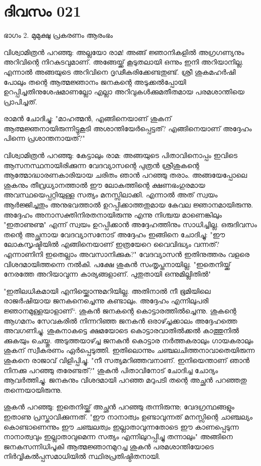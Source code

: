\newpage
\section{ദിവസം 021}

ഭാഗം 2. മുമുക്ഷു പ്രകരണം ആരംഭം 


വിശ്വാമിത്രന്‍ പറഞ്ഞു: അല്ലയോ രാമ! അങ്ങ്‌ ജ്ഞാനികളില്‍ അഗ്രഗണ്യനും അറിവിന്റെ നിറകുടവുമാണ്‌. അങ്ങേയ്ക്ക്‌ കൂടുതലായി ഒന്നും  ഇനി അറിയാനില്ല. എന്നാല്‍ അങ്ങയുടെ അറിവിനെ ദൃഢീകരിക്കേണ്ടതുണ്ട്‌. ശ്രീ ശുകമഹര്‍ഷി പോലും തന്റെ ആത്മജ്ഞാനം ജനകന്റെ അടുക്കല്‍പ്പോയി ഉറപ്പിച്ചതിനുശേഷമാണല്ലോ എല്ലാ അറിവുകള്‍ക്കുമതീതമായ പരമശാന്തിയെ പ്രാപിച്ചത്‌. 

രാമന്‍ ചോദിച്ചു: "മാഹത്മന്‍, എങ്ങിനെയാണ്‌ ശുകന്‌ ആത്മജ്ഞനായിരുന്നിട്ടുകൂടി അശാന്തിയേര്‍പ്പെട്ടത്‌? എങ്ങിനെയാണ്‌ അദ്ദേഹം പിന്നെ പ്രശാന്തനായത്‌?"

വിശ്വാമിത്രന്‍ പറഞ്ഞു: കേട്ടാലും രാമ: അങ്ങയുടെ പിതാവിനൊപ്പം ഇവിടെ ആസനസ്ഥനായിരിക്കുന്ന വേദവ്യാസന്റെ പുത്രന്‍ ശ്രീശുകന്റെ ആത്മോദ്ധാരണകാരിയായ ചരിതം ഞാന്‍ പറഞ്ഞു തരാം. അങ്ങയേപ്പോലെ ശുകനും തീവ്രധ്യാനത്താല്‍ ഈ ലോകത്തിന്റെ ക്ഷണഭംഗുരമായ അവസ്ഥയെപ്പറ്റിയുള്ള സത്യം  മനസ്സിലാക്കി. എന്നാല്‍ അത്‌ സ്വയം ആര്‍ജ്ജിച്ചതും അനുഭവത്താല്‍ ഉറപ്പിക്കാത്തതുമായ കേവല ജ്ഞാനമായിരുന്നു. അദ്ദേഹം അനാസക്തിനിരതനായിരുന്നു എന്നു നിശ്ചയ  മാണെങ്കിലും "ഇതാണുണ്മ" എന്ന് സ്വയം ഉറപ്പിക്കാന്‍ അദ്ദേഹത്തിനും സാധിച്ചില്ല. ഒരുദിവസം തന്റെ അച്ഛനായ വേദവ്യാസനോട്‌ അദ്ദേഹം ഇങ്ങിനെ ചോദിച്ചു: "ഈ ലോകസൃഷ്ടിയില്‍ എങ്ങിനെയാണ്‌ ഇത്രയേറെ വൈവിദ്ധ്യം വന്നത്‌? എന്നാണിനി ഇതെല്ലാം അവസാനിക്കുക?" വേദവ്യാസന്‍ ഇതിനുത്തരം വളരെ വിശദമായിത്തന്നെ നല്‍കി. പക്ഷേ ശുകന്‍ സംതൃപ്തനായില്ല. "ഇതെനിയ്ക്ക്‌ നേരത്തേ അറിയാവുന്ന കാര്യങ്ങളാണ്‌. പുതുതായി ഒന്നുമില്ലിതില്‍"

"ഇതിലധികമായി എനിയ്ക്കൊന്നുമറിയില്ല. അതിനാല്‍ നീ ഭൂമിയിലെ രാജര്‍ഷിയായ ജനകനെച്ചെന്നു കണ്ടാലും. അദ്ദേഹം  എന്നിലുപരി ജ്ഞാനമുള്ളയാളാണ്“.  ശുകന്‍ ജനകന്റെ കൊട്ടാരത്തില്‍ച്ചെന്നു. ശുകന്റെ ആഗമനം സേവകരില്‍ നിന്നറിഞ്ഞ ജനകന്‍ ഒരാഴ്ച്ചക്കാലം അദ്ദേഹത്തെ അവഗണിച്ചു. ശുകനാകട്ടെ ക്ഷമയോടെ കൊട്ടാരവാതില്‍ക്കല്‍ കാത്തുനില്‍ ക്കുകയും ചെയ്തു. അടുത്തയാഴ്ച്ച  ജനകന്‍ കൊട്ടാര നര്‍ത്തകരാലും ഗായകരാലും ശുകന്‌ സ്വീകരണം ഏര്‍പ്പെടുത്തി. ഇതിലൊന്നും ചഞ്ചലചിത്തനാവാതെയിരുന്ന ശുകനെ രാജാവ്‌ വിളിപ്പിച്ചു. "നീ സത്യമറിഞ്ഞവനാണ്‌. ഇനിയെന്താണ്‌ ഞാന്‍ നിനക്കു പറഞ്ഞു തരേണ്ടത്‌?" ശുകന്‍ പിതാവിനോട്‌ ചോദിച്ച ചോദ്യം ആവര്‍ത്തിച്ചു. ജനകനും വിശദമായി പറഞ്ഞ മറുപടി തന്റെ അച്ഛന്‍ പറഞ്ഞതു തന്നെയായിരുന്നു. 

ശുകന്‍ പറഞ്ഞു: ഇതെനിയ്ക്ക്‌ അച്ഛന്‍ പറഞ്ഞു തന്നിരുന്നു; വേദഗ്രന്ഥങ്ങളും ഇതാണു പ്രസ്താവിക്കുന്നത്‌. "ഈ നാനാത്വം ഉണ്ടാവുന്നത്‌ മനസ്സിന്റെ ചാഞ്ചല്യം കൊണ്ടാണെന്നും ഈ ചഞ്ചലത്വം ഇല്ലാതാവുന്നതോടെ ഈ കാണപ്പെടുന്ന നാനാത്വവും ഇല്ലാതാവുമെന്ന സത്യം എന്നിലുറപ്പിച്ചു തന്നാലും" അങ്ങിനെ ജനകസന്നിധിപൂകി ആത്മജ്ഞാനമുറച്ച ശുകന്‍ പരമശാന്തിയോടെ നിര്‍വ്വികല്‍പ്പസമാധിയില്‍ സ്ഥിരപ്രതിഷ്ഠിതനായി.

